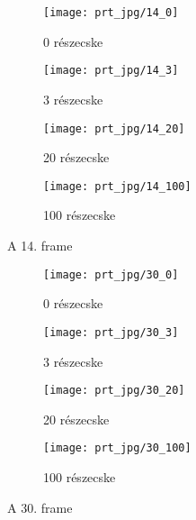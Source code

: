 \begin{figure}[!htb]
    \centering
    \begin{subfigure}[!htb]{0.49\textwidth}
        \centering
        \texttt{[image: prt\_jpg/14\_0]}
        \caption{0 részecske}
    \end{subfigure}
    \hfill
    \begin{subfigure}[!htb]{0.49\textwidth}
        \centering
        \texttt{[image: prt\_jpg/14\_3]}
        \caption{3 részecske}
    \end{subfigure}
    \hfill
    \begin{subfigure}[!htb]{0.49\textwidth}
        \centering
        \texttt{[image: prt\_jpg/14\_20]}
        \caption{20 részecske}
    \end{subfigure}
    \hfill
    \begin{subfigure}[!htb]{0.49\textwidth}
        \centering
        \texttt{[image: prt\_jpg/14\_100]}
        \caption{100 részecske}
    \end{subfigure}
    \caption{A 14. frame}
    \label{fig:x frame14}
\end{figure}

\begin{figure}[!htb]
    \centering
    \begin{subfigure}[!htb]{0.49\textwidth}
        \centering
        \texttt{[image: prt\_jpg/30\_0]}
        \caption{0 részecske}
    \end{subfigure}
    \hfill
    \begin{subfigure}[!htb]{0.49\textwidth}
        \centering
        \texttt{[image: prt\_jpg/30\_3]}
        \caption{3 részecske}
    \end{subfigure}
    \hfill
    \begin{subfigure}[!htb]{0.49\textwidth}
        \centering
        \texttt{[image: prt\_jpg/30\_20]}
        \caption{20 részecske}
    \end{subfigure}
    \hfill
    \begin{subfigure}[!htb]{0.49\textwidth}
        \centering
        \texttt{[image: prt\_jpg/30\_100]}
        \caption{100 részecske}
    \end{subfigure}
    \caption{A 30. frame}
    \label{fig:x frame30}
\end{figure}





